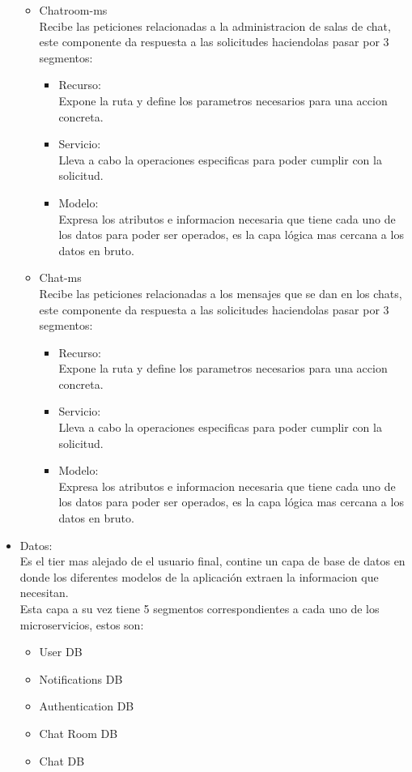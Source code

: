 \begin{itemize}
\begin{itemize}
        \item Chatroom-ms \\
        Recibe las peticiones relacionadas a la administracion de salas de chat, este componente da respuesta a las solicitudes haciendolas pasar por 3 segmentos:
        \begin{itemize}
            \item Recurso: \\
            Expone la ruta y define los parametros necesarios para una accion concreta.
            \item Servicio: \\
            Lleva a cabo la operaciones especificas para poder cumplir con la solicitud.
            \item Modelo: \\
            Expresa los atributos e informacion necesaria que tiene cada uno de los datos para poder ser operados, es la capa lógica mas cercana a los datos en bruto.
        \end{itemize}
        
        \item Chat-ms \\
        Recibe las peticiones relacionadas a los mensajes que se dan en los chats, este componente da respuesta a las solicitudes haciendolas pasar por 3 segmentos:
        \begin{itemize}
            \item Recurso: \\
            Expone la ruta y define los parametros necesarios para una accion concreta.
            \item Servicio: \\
            Lleva a cabo la operaciones especificas para poder cumplir con la solicitud.
            \item Modelo: \\
            Expresa los atributos e informacion necesaria que tiene cada uno de los datos para poder ser operados, es la capa lógica mas cercana a los datos en bruto.
        \end{itemize}
        
    \end{itemize}
    
    \item Datos: \\
    Es el tier mas alejado de el usuario final, contine un capa de base de datos en donde los diferentes modelos de la aplicación extraen la informacion que necesitan.\\
    Esta capa a su vez tiene 5 segmentos correspondientes a cada uno de los microservicios, estos son:
    \begin{itemize}
        \item User DB
        \item Notifications DB
        \item Authentication DB
        \item Chat Room DB
        \item Chat DB
    \end{itemize}
\end{itemize}

